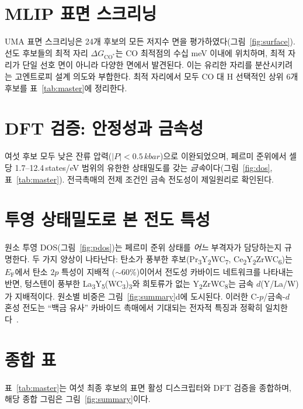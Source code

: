 \documentclass[11pt,a4paper]{report}
\providecommand{\SI}[2]{#1\,#2}
\providecommand{\SIrange}[3]{#1--#2\,#3}
\newcommand{\dGCO}{\Delta G_{\mathrm{CO^*}}}
\newcommand{\Ef}{E_\mathrm{F}}
\begin{document}
\section{MLIP 표면 스크리닝}
UMA 표면 스크리닝은 24개 후보의 모든 저지수 면을 평가하였다(그림~\ref{fig:surface}). 선도 후보들의
최적 자리 $\dGCO$는 CO 최적점의 수십 meV 이내에 위치하며, 최적 자리가 단일 선호 면이 아니라 다양한
면에서 발견된다. 이는 유리한 자리를 분산시키려는 고엔트로피 설계 의도와 부합한다. 최적 자리에서 모두
CO 대 H 선택적인 상위 6개 후보를 표~\ref{tab:master}에 정리한다.

\section{DFT 검증: 안정성과 금속성}
여섯 후보 모두 낮은 잔류 압력($|P|<\SI{0.5}{kbar}$)으로 이완되었으며, 페르미 준위에서 셀당
\SIrange{1.7}{12.4}{states/eV} 범위의 유한한 상태밀도를 갖는 \emph{금속}이다(그림~\ref{fig:dos},
표~\ref{tab:master}). 전극촉매의 전제 조건인 금속 전도성이 제일원리로 확인된다.

\section{투영 상태밀도로 본 전도 특성}
원소 투영 DOS(그림~\ref{fig:pdos})는 페르미 준위 상태를 \emph{어느} 부격자가 담당하는지 규명한다.
두 가지 양상이 나타난다: 탄소가 풍부한 후보(Pr\textsubscript{3}Y\textsubscript{2}WC\textsubscript{7},
Ce\textsubscript{2}Y\textsubscript{2}ZrWC\textsubscript{6})는 $\Ef$에서 탄소 $2p$ 특성이 지배적
($\sim$60\%)이어서 전도성 카바이드 네트워크를 나타내는 반면, 텅스텐이 풍부한
La\textsubscript{3}Y\textsubscript{5}(WC\textsubscript{3})\textsubscript{3}와 희토류가 없는
Y\textsubscript{2}ZrWC\textsubscript{8}는 금속 $d$(Y/La/W)가 지배적이다. 원소별 비중은
그림~\ref{fig:summary}d에 도시된다. 이러한 C-$p$/금속-$d$ 혼성 전도는 ``백금 유사'' 카바이드
촉매에서 기대되는 전자적 특징과 정확히 일치한다~\cite{levy1973}.

\section{종합 표}
표~\ref{tab:master}는 여섯 최종 후보의 표면 활성 디스크립터와 DFT 검증을 종합하며, 해당 종합 그림은
그림~\ref{fig:summary}이다.
\end{document}
